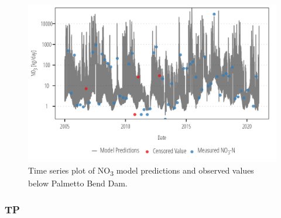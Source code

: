 \documentclass[
]{article}
\begin{document}
\begin{figure}[h]

{\centering \includegraphics{model_assessment_files/figure-pdf/unnamed-chunk-67-1.png}

}

\caption{Time series plot of NO\textsubscript{3} model predictions and
observed values below Palmetto Bend Dam.}

\end{figure}

\clearpage

\hypertarget{tp-5}{%
\subsubsection{TP}\label{tp-5}}
\end{document}
